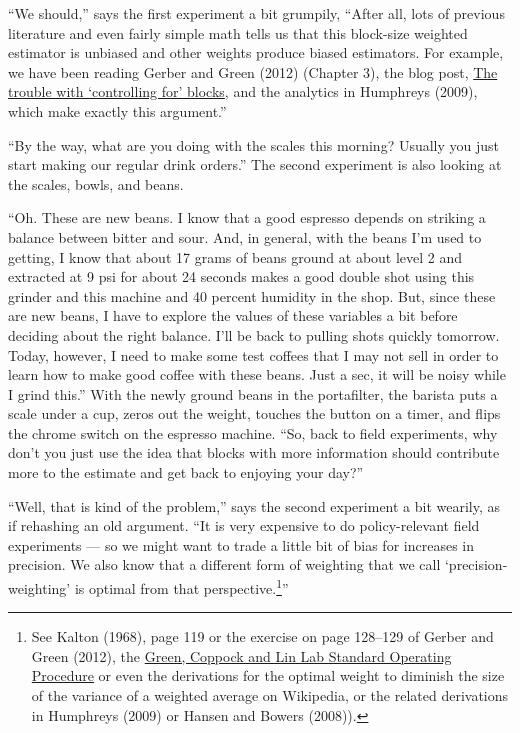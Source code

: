 \documentclass[
]{article}
\begin{document}
``We should,'' says the first experiment a bit grumpily, ``After all, lots of
previous literature and even fairly simple math tells us that this block-size
weighted estimator is unbiased and other weights produce biased estimators. For
example, we have been reading Gerber and Green (2012) (Chapter 3), the blog post,
\href{https://declaredesign.org/blog/biased-fixed-effects.html}{The trouble with `controlling for'
blocks}, and the
analytics in Humphreys (2009), which make exactly this argument.''

``By the way, what are you doing with the scales this morning? Usually you just
start making our regular drink orders.'' The second experiment is also looking
at the scales, bowls, and beans.

``Oh. These are new beans. I know that a good espresso depends on striking a
balance between bitter and sour. And, in general, with the beans I'm used to
getting, I know that about 17 grams of beans ground at about level 2 and
extracted at 9 psi for about 24 seconds makes a good double shot using this
grinder and this machine and 40 percent humidity in the shop. But, since these
are new beans, I have to explore the values of these variables a bit before
deciding about the right balance. I'll be back to pulling shots quickly
tomorrow. Today, however, I need to make some test coffees that I may not sell
in order to learn how to make good coffee with these beans. Just a sec, it will
be noisy while I grind this.'' With the newly ground beans in the portafilter,
the barista puts a scale under a cup, zeros out the weight, touches the button
on a timer, and flips the chrome switch on the espresso machine. ``So, back to
field experiments, why don't you just use the idea that blocks with more
information should contribute more to the estimate and get back to enjoying
your day?''

``Well, that is kind of the problem,'' says the second experiment a bit wearily, as if rehashing an old argument. ``It is very expensive to do policy-relevant field experiments --- so we might want to trade a little bit of bias for increases in precision. We also know that a different form of weighting that we call `precision-weighting' is optimal from that perspective.\footnote{See Kalton (1968), page 119 or the exercise on page 128--129 of Gerber and Green (2012), the \href{https://alexandercoppock.com/Green-Lab-SOP/Green_Lab_SOP.html\#taking-block-randomization-into-account-in-ses-and-cis}{Green, Coppock and Lin Lab Standard Operating Procedure} or even the derivations for the optimal weight to diminish the size of the variance of a weighted average on Wikipedia, or the related derivations in Humphreys (2009) or Hansen and Bowers (2008)).}''
\end{document}
